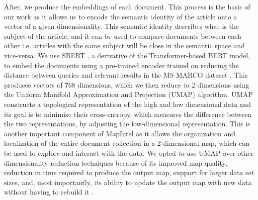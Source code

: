 \documentclass[a4paper]{article}
\begin{document}
After, we produce the embeddings of each document. This process is the basis of our work as it allows us to encode the semantic identity of the article onto a vector of a given dimensionality. This semantic identity describes what is the subject of the article, and it can be used to compare documents between each other i.e. articles with the same subject will be close in the semantic space and vice-versa. We use SBERT \citep{reimers2019}, a derivative of the Transformer-based BERT model, to embed the documents using a pre-trained encoder trained on reducing the distance between queries and relevant results in the MS MARCO dataset \citep{bajaj2018}. This produces vectors of 768 dimensions, which we then reduce to 2 dimensions using the Uniform Manifold Approximation and Projection (UMAP) \citep{mcinnes2020} algorithm. UMAP constructs a topological representation of the high and low dimensional data and its goal is to minimize their cross-entropy, which measures the difference between the two representations, by adjusting the low-dimensional representation. This is another important component of MapIntel as it allows the organization and localization of the entire document collection in a 2-dimensional map, which can be used to explore and interact with the data. We opted to use UMAP over other dimensionality reduction techniques because of its improved map quality, reduction in time required to produce the output map, support for larger data set sizes, and, most importantly, its ability to update the output map with new data without having to rebuild it \citep{mcinnes2020}.
\end{document}
